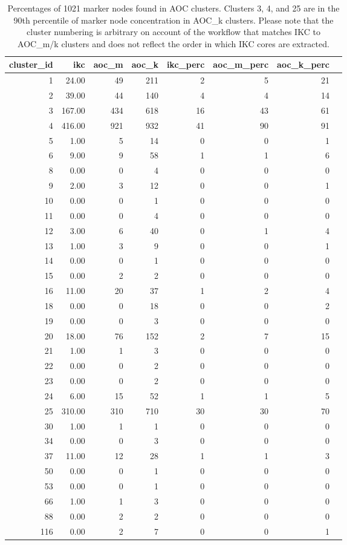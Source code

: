 \documentclass[11pt, oneside]{article}   	%
\begin{document}
\begin{table}[ht]
\centering
\begin{tabular}{rrrrrrrr}
  \hline
cluster\_id & ikc & aoc\_m & aoc\_k & ikc\_perc & aoc\_m\_perc & aoc\_k\_perc \\ 
  \hline
1 & 24.00 &  49 & 211 &   2 &   5 &  21 \\ 
2 & 39.00 &  44 & 140 &   4 &   4 &  14 \\ 
3 & 167.00 & 434 & 618 &  16 &  43 &  61 \\ 
4 & 416.00 & 921 & 932 &  41 &  90 &  91 \\ 
5 & 1.00 &   5 &  14 &   0 &   0 &   1 \\ 
6 & 9.00 &   9 &  58 &   1 &   1 &   6 \\ 
8 & 0.00 &   0 &   4 &   0 &   0 &   0 \\ 
9 & 2.00 &   3 &  12 &   0 &   0 &   1 \\ 
10 & 0.00 &   0 &   1 &   0 &   0 &   0 \\ 
11 & 0.00 &   0 &   4 &   0 &   0 &   0 \\ 
12 & 3.00 &   6 &  40 &   0 &   1 &   4 \\ 
13 & 1.00 &   3 &   9 &   0 &   0 &   1 \\ 
14 & 0.00 &   0 &   1 &   0 &   0 &   0 \\ 
15 & 0.00 &   2 &   2 &   0 &   0 &   0 \\ 
16 & 11.00 &  20 &  37 &   1 &   2 &   4 \\ 
18 & 0.00 &   0 &  18 &   0 &   0 &   2 \\ 
19 & 0.00 &   0 &   3 &   0 &   0 &   0 \\ 
20 & 18.00 &  76 & 152 &   2 &   7 &  15 \\ 
21 & 1.00 &   1 &   3 &   0 &   0 &   0 \\ 
22 & 0.00 &   0 &   2 &   0 &   0 &   0 \\ 
23 & 0.00 &   0 &   2 &   0 &   0 &   0 \\ 
24 & 6.00 &  15 &  52 &   1 &   1 &   5 \\ 
25 & 310.00 & 310 & 710 &  30 &  30 &  70 \\ 
30 & 1.00 &   1 &   1 &   0 &   0 &   0 \\ 
34 & 0.00 &   0 &   3 &   0 &   0 &   0 \\ 
37 & 11.00 &  12 &  28 &   1 &   1 &   3 \\ 
50 & 0.00 &   0 &   1 &   0 &   0 &   0 \\ 
53 & 0.00 &   0 &   1 &   0 &   0 &   0 \\ 
66 & 1.00 &   1 &   3 &   0 &   0 &   0 \\ 
88 & 0.00 &   2 &   2 &   0 &   0 &   0 \\ 
116 & 0.00 &  2 &   7 &   0 &   0 &   1 \\ 
   \hline
\end{tabular}
\caption{Percentages of 1021 marker nodes found in AOC clusters. Clusters 3, 4, and 25 are in the 90th percentile of marker node concentration in AOC\_k clusters. Please note that the cluster numbering is arbitrary on account of the workflow that matches IKC to AOC\_m/k clusters and does not reflect the order in which IKC cores are extracted.}
\end{table}
\end{document}
